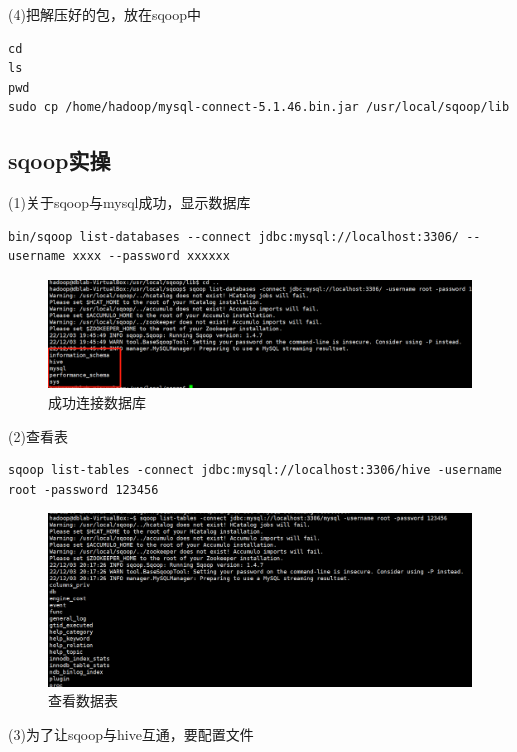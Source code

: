 \documentclass[12pt]{article}
\begin{document}
(4)把解压好的包，放在sqoop中

\begin{lstlisting}
cd
ls
pwd
sudo cp /home/hadoop/mysql-connect-5.1.46.bin.jar /usr/local/sqoop/lib
\end{lstlisting}

\subsection{sqoop实操}
(1)关于sqoop与mysql成功，显示数据库

\begin{lstlisting}
bin/sqoop list-databases --connect jdbc:mysql://localhost:3306/ --username xxxx --password xxxxxx
\end{lstlisting}

\begin{figure}[ht]
\centering
\includegraphics[scale=0.6]{figures/333.png}
\caption{成功连接数据库}\label{fig:label2}
\end{figure}

\newpage
(2)查看表

\begin{lstlisting}
sqoop list-tables -connect jdbc:mysql://localhost:3306/hive -username root -password 123456
\end{lstlisting}

\begin{figure}[ht]
\centering
\includegraphics[scale=0.6]{figures/444.png}
\caption{查看数据表}\label{fig:label2}
\end{figure}

(3)为了让sqoop与hive互通，要配置文件
\end{document}
